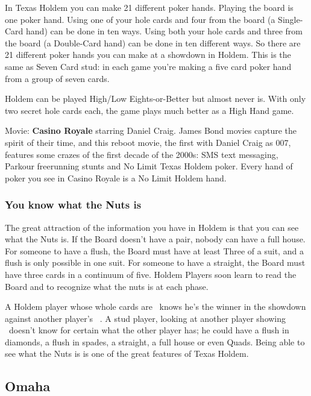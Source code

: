 In Texas Holdem you can make 21 different poker hands. Playing the
board is one poker hand. Using one of your hole cards and four from the
board (a Single-Card hand) can be done in ten ways. Using both your
hole cards and three from the board (a Double-Card hand) can be done
in ten different ways. So there are 21 different poker hands you can
make at a showdown in Holdem. This is the same as Seven Card
stud: in each game you're making a five card poker hand from a
group of seven cards.

Holdem can be played High/Low Eights-or-Better but almost never
is. With only two secret hole cards each, the game plays much better
as a High Hand game.

Movie: \textbf{Casino Royale} starring Daniel Craig. James Bond movies
capture the spirit of their time, and this reboot movie, the first
with Daniel Craig as 007, features some crazes of the first decade of
the 2000s: SMS text messaging, Parkour freerunning stunts and No Limit
Texas Holdem poker. Every hand of poker you see in Casino Royale is a
No Limit Holdem hand.

\subsubsection{You know what the Nuts is}

The great attraction of the information you have in Holdem is that you
can see what the Nuts is. If the Board doesn't have a pair, nobody can
have a full house. For someone to have a flush, the Board must have at
least Three of a suit, and a flush is only possible in one suit. For
someone to have a straight, the Board must have three cards in a
continuum of five. Holdem Players soon learn to read the Board and to
recognize what the nuts is at each phase.

A Holdem player whose whole cards are \Ad\tred\ knows he's the winner
in the showdown against another player's
\back\back\nines\Qd\Jd\tres\fourd\ . A stud player, looking at another
player showing \back\back\nines\Qd\Jd\tres\back\ doesn't know for
certain what the other player has; he could have a flush in diamonds,
a flush in spades, a straight, a full house or even Quads. Being able
to see what the Nuts is is one of the great features of Texas Holdem.

\subsection{Omaha}

